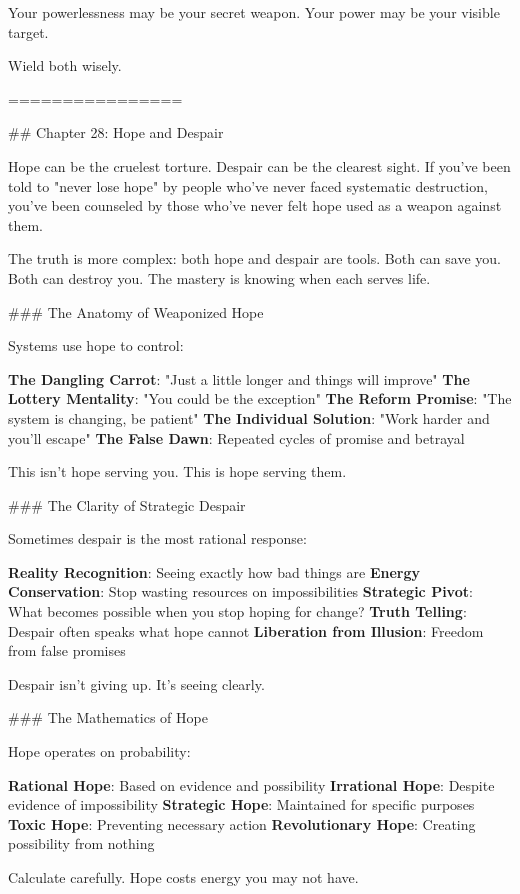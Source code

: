 \documentclass[12pt]{book}
\begin{document}
Your powerlessness may be your secret weapon. Your power may be your visible target.

Wield both wisely.

================

\#\# Chapter 28: Hope and Despair

Hope can be the cruelest torture. Despair can be the clearest sight. If you've been told to "never lose hope" by people who've never faced systematic destruction, you've been counseled by those who've never felt hope used as a weapon against them.

The truth is more complex: both hope and despair are tools. Both can save you. Both can destroy you. The mastery is knowing when each serves life.

\#\#\# The Anatomy of Weaponized Hope

Systems use hope to control:

\textbf{The Dangling Carrot}: "Just a little longer and things will improve"
\textbf{The Lottery Mentality}: "You could be the exception"
\textbf{The Reform Promise}: "The system is changing, be patient"
\textbf{The Individual Solution}: "Work harder and you'll escape"
\textbf{The False Dawn}: Repeated cycles of promise and betrayal

This isn't hope serving you. This is hope serving them.

\#\#\# The Clarity of Strategic Despair

Sometimes despair is the most rational response:

\textbf{Reality Recognition}: Seeing exactly how bad things are
\textbf{Energy Conservation}: Stop wasting resources on impossibilities
\textbf{Strategic Pivot}: What becomes possible when you stop hoping for change?
\textbf{Truth Telling}: Despair often speaks what hope cannot
\textbf{Liberation from Illusion}: Freedom from false promises

Despair isn't giving up. It's seeing clearly.

\#\#\# The Mathematics of Hope

Hope operates on probability:

\textbf{Rational Hope}: Based on evidence and possibility
\textbf{Irrational Hope}: Despite evidence of impossibility
\textbf{Strategic Hope}: Maintained for specific purposes
\textbf{Toxic Hope}: Preventing necessary action
\textbf{Revolutionary Hope}: Creating possibility from nothing

Calculate carefully. Hope costs energy you may not have.
\end{document}
